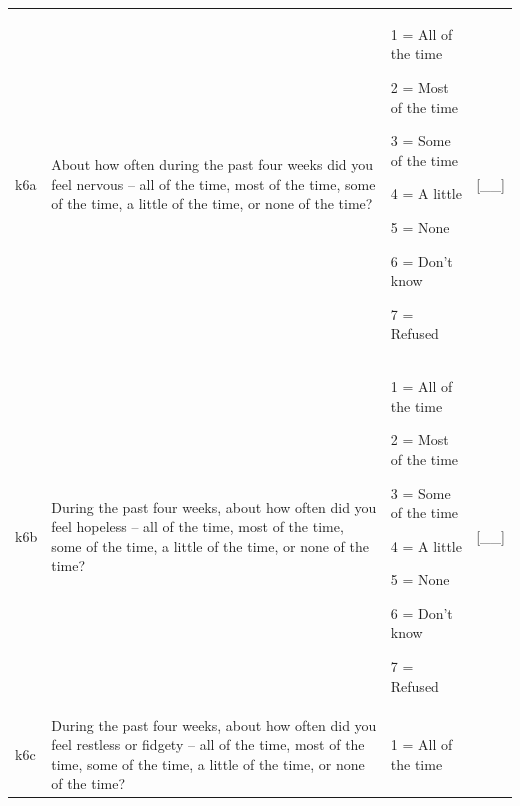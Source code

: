 \documentclass[12pt,a4paper]{book}
\theoremstyle{definition}
\theoremstyle{definition}
\theoremstyle{definition}
\theoremstyle{remark}
\begin{document}
\begin{longtable}[]{@{}llll@{}}
\toprule
\begin{minipage}[t]{0.24\columnwidth}\raggedright
k6a\strut
\end{minipage} & \begin{minipage}[t]{0.24\columnwidth}\raggedright
About how often during the past four weeks did you feel nervous -- all
of the time, most of the time, some of the time, a little of the time,
or none of the time?\strut
\end{minipage} & \begin{minipage}[t]{0.24\columnwidth}\raggedright
1 = All of the time

2 = Most of the time

3 = Some of the time

4 = A little

5 = None

6 = Don't know

7 = Refused\strut
\end{minipage} & \begin{minipage}[t]{0.24\columnwidth}\raggedright
{[}\_\_{]}\strut
\end{minipage}\tabularnewline
\begin{minipage}[t]{0.24\columnwidth}\raggedright
k6b\strut
\end{minipage} & \begin{minipage}[t]{0.24\columnwidth}\raggedright
During the past four weeks, about how often did you feel hopeless -- all
of the time, most of the time, some of the time, a little of the time,
or none of the time?\strut
\end{minipage} & \begin{minipage}[t]{0.24\columnwidth}\raggedright
1 = All of the time

2 = Most of the time

3 = Some of the time

4 = A little

5 = None

6 = Don't know

7 = Refused\strut
\end{minipage} & \begin{minipage}[t]{0.24\columnwidth}\raggedright
{[}\_\_{]}\strut
\end{minipage}\tabularnewline
\begin{minipage}[t]{0.24\columnwidth}\raggedright
k6c\strut
\end{minipage} & \begin{minipage}[t]{0.24\columnwidth}\raggedright
During the past four weeks, about how often did you feel restless or
fidgety -- all of the time, most of the time, some of the time, a little
of the time, or none of the time?\strut
\end{minipage} & \begin{minipage}[t]{0.24\columnwidth}\raggedright
1 = All of the time


\end{minipage}
\end{longtable}
\end{document}
